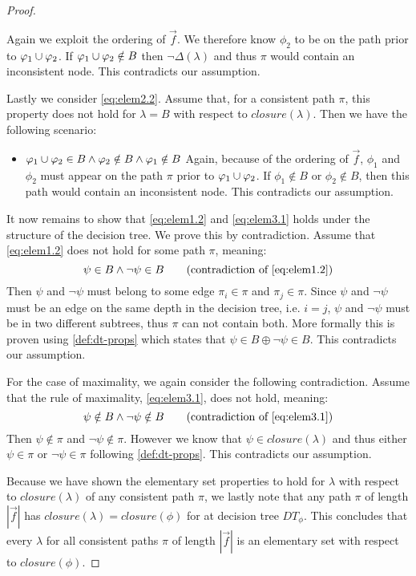 \begin{proof}
\begin{itemize}
    Again we exploit the ordering of $\vec{f}$. We therefore know $\phi_2$ to be on the path prior to $\varphi_1 \cup \varphi_2$. If $\varphi_1 \cup \varphi_2 \notin B$ then $\lnot\Delta(\lambda)$ and thus $\pi$ would contain an inconsistent node. This contradicts our assumption.
\end{itemize}
Lastly we consider \autoref{eq:elem2.2}. Assume that, for a consistent path $\pi$, this property does not hold for $\lambda=B$ with respect to $closure(\lambda)$. Then we have the following scenario:
\begin{itemize}
    \item $\varphi_1 \cup \varphi_2 \in B \land \varphi_2 \notin B \land \varphi_1 \notin B$ \quad Again, because of the ordering of $\vec{f}$, $\phi_1$ and $\phi_2$ must appear on the path $\pi$ prior to $\varphi_1 \cup \varphi_2$. If $\phi_1 \notin B$ or $\phi_2 \notin B$, then this path would contain an inconsistent node. This contradicts our assumption.
\end{itemize}

It now remains to show that \autoref{eq:elem1.2} and \autoref{eq:elem3.1} holds under the structure of the decision tree. We prove this by contradiction. Assume that \autoref{eq:elem1.2} does not hold for some path $\pi$, meaning:
\begin{equation*}
    \psi \in B \land \lnot \psi \in B \tag{contradiction of \ref{eq:elem1.2}}
\end{equation*}
Then $\psi$ and $\lnot \psi$ must belong to some edge $\pi_i \in \pi$ and $\pi_j \in \pi$. Since $\psi$ and $\lnot\psi$ must be an edge on the same depth in the decision tree, i.e. $i=j$, $\psi$ and $\lnot \psi$ must be in two different subtrees, thus $\pi$ can not contain both. More formally this is proven using \autoref{def:dt-props} which states that $\psi \in B \oplus \lnot\psi \in B$. This contradicts our assumption.

For the case of maximality, we again consider the following contradiction. Assume that the rule of maximality, \autoref{eq:elem3.1}, does not hold, meaning:
\begin{equation*}
    \psi \notin B \land \lnot \psi \notin B \tag{contradiction of \ref{eq:elem3.1}}
\end{equation*}
Then $\psi \notin \pi$ and $\lnot\psi \notin \pi$. However we know that $\psi \in closure(\lambda)$ and thus either $\psi \in \pi$ or $\lnot\psi \in \pi$ following \autoref{def:dt-props}. This contradicts our assumption.

Because we have shown the elementary set properties to hold for $\lambda$  with respect to $closure(\lambda)$ of any consistent path $\pi$, we lastly note that any path $\pi$ of length $|\vec{f}|$ has $closure(\lambda)=closure(\phi)$ for at decision tree $DT_\phi$. This concludes that every $\lambda$ for all consistent paths $\pi$ of length $|\vec{f}|$ is an elementary set with respect to $closure(\phi)$.
\end{proof}

